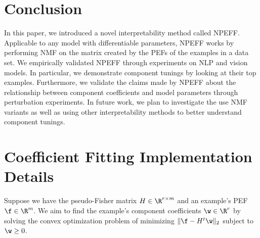 \documentclass[dvipsnames]{article}
\begin{document}






\section{Conclusion}
In this paper, we introduced a novel interpretability method called NPEFF.
Applicable to any model with differentiable parameters, NPEFF works by performing NMF on the matrix created by the PEFs of the examples in a data set.
We empirically validated NPEFF through experiments on NLP and vision models.
In particular, we demonstrate component tunings by looking at their top examples.
Furthermore, we validate the claims made by NPEFF about the relationship between component coefficients and model parameters through perturbation experiments.
In future work, we plan to investigate the use NMF variants as well as using other interpretability methods to better understand component tunings.









\newpage
\appendix
\onecolumn

\section{Coefficient Fitting Implementation Details}\label{sec:coeff_fitting_details}
Suppose we have the pseudo-Fisher matrix $H \in \R^{r\times m}$ and an example's PEF $\f\in\R^m$.
We aim to find the example's component coefficients $\w\in\R^r$ by solving the convex optimization problem of minimizing $\|\f-H^t\w\|_2$ subject to $\w\geq0$.
\end{document}
